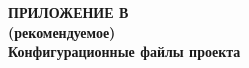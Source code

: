 

\newpage

\begin{center}
\textbf{
\MakeUppercase{Приложение В}\\
(рекомендуемое)\\
Конфигурационные файлы проекта}
\end{center}


\newpage

